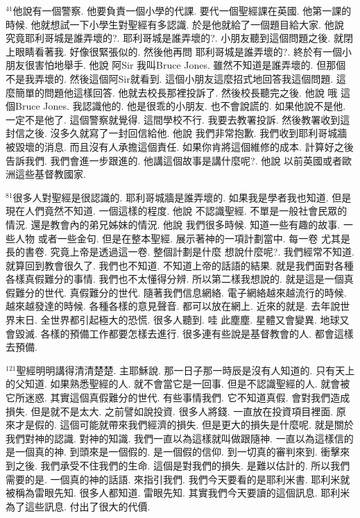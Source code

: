 \documentclass{book}
\begin{document}
$^{41}$他說有一個警察.
他要負責一個小學的代課.
要代一個聖經課在英國.
他第一課的時候.
他就想試一下小學生對聖經有多認識.
於是他就給了一個題目給大家.
他說 究竟耶利哥城是誰弄壞的?.
耶利哥城是誰弄壞的?.
小朋友聽到這個問題之後.
就閉上眼睛看著我.
好像很緊張似的.
然後他再問 耶利哥城是誰弄壞的?.
終於有一個小朋友很害怕地舉手.
他說 阿Sir 我叫Bruce Jones.
雖然不知道是誰弄壞的.
但那個不是我弄壞的.
然後這個阿Sir就看到.
這個小朋友這麼招式地回答我這個問題.
這麼簡單的問題他這樣回答.
他就去校長那裡投訴了.
然後校長聽完之後.
他說 哦 這個Bruce Jones.
我認識他的.
他是很乖的小朋友.
也不會說謊的.
如果他說不是他.
一定不是他了.
這個警察就覺得.
這間學校不行.
我要去教署投訴.
然後教署收到這封信之後.
沒多久就寫了一封回信給他.
他說 我們非常抱歉.
我們收到耶利哥城牆被毀壞的消息.
而且沒有人承擔這個責任.
如果你肯將這個維修的成本.
計算好之後告訴我們.
我們會進一步跟進的.
他講這個故事是講什麼呢?.
他說 以前英國或者歐洲這些基督教國家.

$^{81}$很多人對聖經是很認識的.
耶利哥城牆是誰弄壞的.
如果我是學者我也知道.
但是現在人們竟然不知道.
一個這樣的程度.
他說 不認識聖經.
不單是一般社會民眾的情況.
還是教會內的弟兄姊妹的情況.
他說 我們很多時候.
知道一些有趣的故事.
一些人物 或者一些金句.
但是在整本聖經.
展示著神的一項計劃當中.
每一卷 尤其是長的書卷.
究竟上帝是透過這一卷.
整個計劃是什麼 想說什麼呢?.
我們經常不知道.
就算回到教會很久了.
我們也不知道.
不知道上帝的話語的結果.
就是我們面對各種各樣真假難分的事情.
我們也不太懂得分辨.
所以第二樣我想說的.
就是這是一個真假難分的世代.
真假難分的世代.
隨著我們信息網絡.
電子網絡越來越流行的時候.
越來越發達的時候.
各種各樣的意見聲音.
都可以放在網上.
近來的就是.
去年說世界末日.
全世界都引起極大的恐慌.
很多人聽到.
哇 此塵塵.
星體又會變異.
地球又會毀滅.
各樣的預備工作都要怎樣去進行.
很多連有些說是基督教會的人.
都會這樣去預備.

$^{121}$聖經明明講得清清楚楚.
主耶穌說.
那一日子那一時辰是沒有人知道的.
只有天上的父知道.
如果熟悉聖經的人.
就不會當它是一回事.
但是不認識聖經的人.
就會被它所迷惑.
其實這個真假難分的世代.
有些事情我們.
它不知道真假.
會對我們造成損失.
但是就不是太大.
之前譬如說投資.
很多人將錢.
一直放在投資項目裡面.
原來才是假的.
這個可能就帶來我們經濟的損失.
但是更大的損失是什麼呢.
就是關於我們對神的認識.
對神的知識.
我們一直以為這樣就叫做跟隨神.
一直以為這樣信的是一個真的神.
到頭來是一個假的.
是一個假的信仰.
到一切真的審判來到.
衝擊來到之後.
我們承受不住我們的生命.
這個是對我們的損失.
是難以估計的.
所以我們需要的是.
一個真的神的話語.
來指引我們.
我們今天要看的是耶利米書.
耶利米就被稱為雷眼先知.
很多人都知道.
雷眼先知.
其實我們今天要讀的這個訊息.
耶利米為了這些訊息.
付出了很大的代價.
\end{document}

